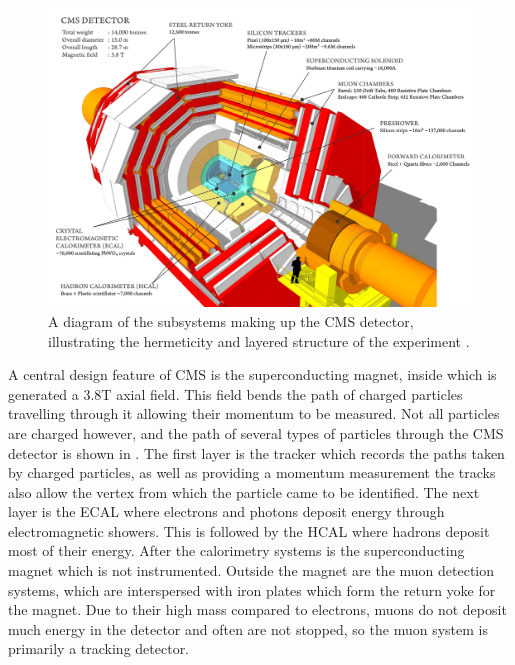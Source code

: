 \begin{figure}
  \includegraphics[width=1.2\largefigwidth]{plots/detector/cms_120918_03.png}
  \caption{A diagram of the subsystems making up the CMS detector, illustrating the hermeticity and layered structure of the experiment \cite{cmsschematic}.}
  \label{fig:cmsschematic1}
\end{figure}

A central design feature of CMS is the superconducting magnet, inside which is generated a 3.8T axial field. This field bends the path of charged particles travelling through it allowing their momentum to be measured. Not all particles are charged however, and the path of several types of particles through the CMS detector is shown in . The first layer is the tracker which records the paths taken by charged particles, as well as providing a momentum measurement the tracks also allow the vertex from which the particle came to be identified. The next layer is the \ac{ECAL} where electrons and photons deposit energy through electromagnetic showers. This is followed by the \ac{HCAL} where hadrons deposit most of their energy. After the calorimetry systems is the superconducting magnet which is not instrumented. Outside the magnet are the muon detection systems, which are interspersed with iron plates which form the return yoke for the magnet. Due to their high mass compared to electrons, muons do not deposit much energy in the detector and often are not stopped, so the muon system is primarily a tracking detector.

